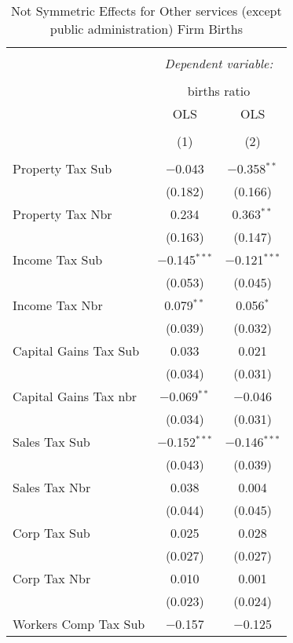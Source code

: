 
\begin{table}[!htbp] \centering 
  \caption{Not Symmetric Effects for  Other services (except public administration) Firm Births} 
  \label{81noequality} 
\begin{tabular}{@{\extracolsep{5pt}}lcc} 
\\[-1.8ex]\hline 
\hline \\[-1.8ex] 
 & \multicolumn{2}{c}{\textit{Dependent variable:}} \\ 
\cline{2-3} 
\\[-1.8ex] & \multicolumn{2}{c}{births ratio} \\ 
 & OLS & OLS \\ 
\\[-1.8ex] & (1) & (2)\\ 
\hline \\[-1.8ex] 
 Property Tax Sub & $-$0.043 & $-$0.358$^{**}$ \\ 
  & (0.182) & (0.166) \\ 
  Property Tax Nbr & 0.234 & 0.363$^{**}$ \\ 
  & (0.163) & (0.147) \\ 
  Income Tax Sub & $-$0.145$^{***}$ & $-$0.121$^{***}$ \\ 
  & (0.053) & (0.045) \\ 
  Income Tax Nbr & 0.079$^{**}$ & 0.056$^{*}$ \\ 
  & (0.039) & (0.032) \\ 
  Capital Gains Tax Sub & 0.033 & 0.021 \\ 
  & (0.034) & (0.031) \\ 
  Capital Gains Tax nbr & $-$0.069$^{**}$ & $-$0.046 \\ 
  & (0.034) & (0.031) \\ 
  Sales Tax Sub & $-$0.152$^{***}$ & $-$0.146$^{***}$ \\ 
  & (0.043) & (0.039) \\ 
  Sales Tax Nbr & 0.038 & 0.004 \\ 
  & (0.044) & (0.045) \\ 
  Corp Tax Sub & 0.025 & 0.028 \\ 
  & (0.027) & (0.027) \\ 
  Corp Tax Nbr & 0.010 & 0.001 \\ 
  & (0.023) & (0.024) \\ 
  Workers Comp Tax Sub & $-$0.157 & $-$0.125 \\ 

\end{tabular}
\end{table}
